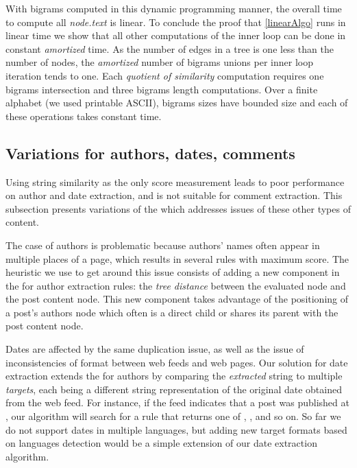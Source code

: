 With bigrams computed in this dynamic programming manner, the overall 
time to compute all \code{(}\emph{node.text}\code{)} 
is linear. To conclude the proof that \autoref{linearAlgo} runs in linear 
time we show that all other computations of the inner loop can be done 
in constant \emph{amortized} time. As the number of edges in a tree is 
one less than the number of nodes, the \emph{amortized} number of bigrams 
unions per inner loop iteration tends to one. Each \emph{quotient of 
similarity} computation requires one bigrams intersection and three 
bigrams length computations. Over a finite alphabet (we used printable 
ASCII), bigrams sizes have bounded size and each of these operations 
takes constant time.

\subsection{Variations for authors, dates, comments}
\label{variationsforauthorsdatesandcomments}

Using string similarity as the only score measurement leads to poor 
performance on author and date extraction, and is not suitable for 
comment extraction. This subsection presents variations of the 
 which addresses issues of these other types of content.

The case of authors is problematic because authors' names often appear in 
multiple places of a page, which results in several rules with maximum 
 score. The heuristic we use to get around this 
issue consists of adding a new component in the  for 
author extraction rules: the \emph{tree distance} between the evaluated 
node and the post content node. This new component takes advantage of 
the positioning of a post's authors node which often is a direct child 
or shares its parent with the post content node.

Dates are affected by the same duplication issue, as well as the issue of 
inconsistencies of format between web feeds and web pages. Our solution 
for date extraction extends the  for authors by 
comparing the \emph{extracted} string to multiple \emph{targets}, each 
being a different string representation of the original date obtained 
from the web feed. For instance, if the feed indicates that a post was 
published at , our algorithm 
will search for a rule that returns one of , ,  and so on. So far we do not support dates in multiple languages, 
but adding new target formats based on languages detection would be a 
simple extension of our date extraction algorithm.

